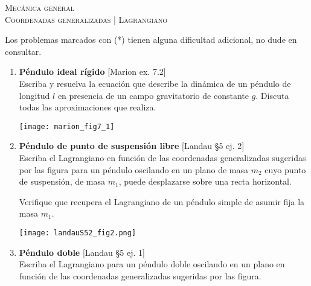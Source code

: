 \documentclass[11pt,spanish,a4paper]{article}
\begin{document}
\begin{center}
  \textsc{\large Mecánica general}\\
  \textsc{\large Coordenadas generalizadas | Lagrangiano}
\end{center}

\noindent
Los problemas marcados con (*) tienen alguna dificultad adicional, no dude en consultar.
\begin{enumerate}


\item \begin{minipage}[t][6cm]{0.75\textwidth}
\textbf{Péndulo ideal rígido} [Marion ex. 7.2]\\
Escriba y resuelva la ecuación que describe la dinámica de un péndulo de longitud $l$ en presencia de un campo gravitatorio de constante $g$. Discuta todas las aproximaciones que realiza.
\end{minipage}
\begin{minipage}[c][1cm][t]{0.25\textwidth}
	\texttt{[image: marion\_fig7\_1]}
\end{minipage}




\item \begin{minipage}[t][3.5cm]{0.7\textwidth}
\textbf{Péndulo de punto de suspensión libre} [Landau \S5 ej. 2]\\
Escriba el Lagrangiano en función de las coordenadas generalizadas sugeridas por las figura para un péndulo oscilando en un plano de masa \(m_2\) cuyo punto de suspensión, de masa \(m_1\), puede desplazarse sobre una recta horizontal.

Verifique que recupera el Lagrangiano de un péndulo simple de asumir fija la masa \(m_1\).
\end{minipage}
	\begin{minipage}[c][1cm][t]{0.3\textwidth}
        \texttt{[image: landauS52\_fig2.png]}
\end{minipage}




\item \begin{minipage}[t][4.5cm]{0.7\textwidth}
\textbf{Péndulo doble} [Landau \S5 ej. 1]\\
Escriba el Lagrangiano para un péndulo doble oscilando en un plano en función de las coordenadas generalizadas sugeridas por las figura.


\end{minipage}
\end{enumerate}
\end{document}
